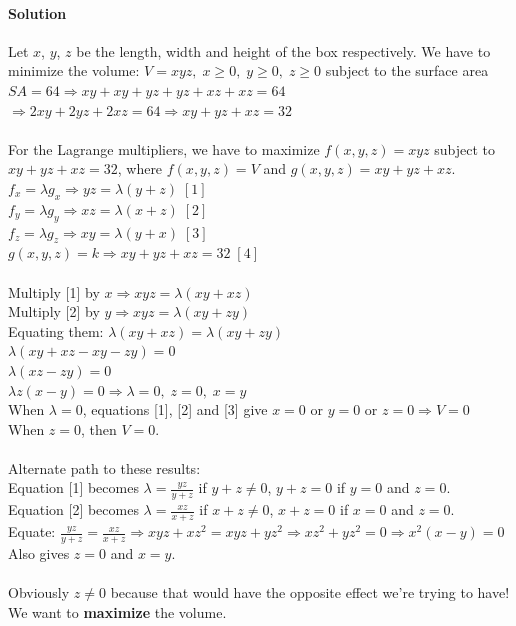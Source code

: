 \documentclass{article}
\begin{document}
\paragraph{Solution} Let $x$, $y$, $z$ be the length, width and height of the box respectively.
We have to minimize the volume: $V=xyz,\;x\geq0,\;y\geq0,\;z\geq0$
subject to the surface area $SA=64\Rightarrow xy+xy+yz+yz+xz+xz=64$
\\$\Rightarrow 2xy+2yz+2xz=64\Rightarrow xy+yz+xz=32$
\\\\For the Lagrange multipliers, we have to maximize $f(x,y,z)=xyz$ subject to $xy+yz+xz=32$, where $f(x,y,z)=V$ and $g(x,y,z)=xy+yz+xz$.
\\$f_x=\lambda g_x\Rightarrow yz=\lambda(y+z)\;[1]$
\\$f_y=\lambda g_y\Rightarrow xz=\lambda(x+z)\;[2]$
\\$f_z=\lambda g_z\Rightarrow xy=\lambda(y+x)\;[3]$
\\$g(x,y,z)=k\Rightarrow xy+yz+xz=32\;[4]$
\\\\Multiply [1] by $x\Rightarrow xyz=\lambda(xy+xz)$
\\Multiply [2] by $y\Rightarrow xyz=\lambda(xy+zy)$
\\Equating them: $\lambda(xy+xz)=\lambda(xy+zy)$
\\$\lambda(xy+xz-xy-zy)=0$
\\$\lambda(xz-zy)=0$
\\$\lambda z(x-y)=0\Rightarrow \lambda=0,\;z=0,\;x=y$
\\When $\lambda=0$, equations [1], [2] and [3] give $x=0$ or $y=0$ or $z=0\Rightarrow V=0$
\\When $z=0$, then $V=0$.
\\\\Alternate path to these results:
\\Equation [1] becomes $\lambda=\frac{yz}{y+z}$ if $y+z\neq0$, $y+z=0$ if $y=0$ and $z=0$.
\\Equation [2] becomes $\lambda=\frac{xz}{x+z}$ if $x+z\neq0$, $x+z=0$ if $x=0$ and $z=0$.
\\Equate: $\frac{yz}{y+z}=\frac{xz}{x+z}\Rightarrow xyz+xz^2=xyz+yz^2\Rightarrow xz^2+yz^2=0\Rightarrow x^2(x-y)=0$
\\Also gives $z=0$ and $x=y$.
\\\\Obviously $z\neq0$ because that would have the opposite effect we're trying to have! We want to \textbf{maximize} the volume.
\end{document}
